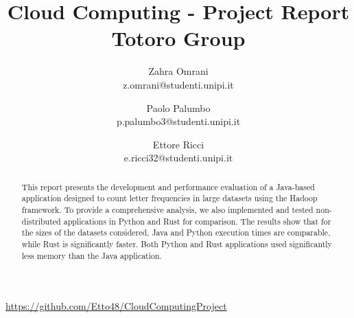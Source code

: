 \documentclass{article}
\title{Cloud Computing - Project Report \\ \small{Totoro Group}}
\author{
    Zahra Omrani \\ z.omrani@studenti.unipi.it \and 
    Paolo Palumbo \\ p.palumbo3@studenti.unipi.it \and
    Ettore Ricci \\ e.ricci32@studenti.unipi.it}
\begin{document}
\maketitle
\begin{center}
    \scriptsize
    \href{https://github.com/Etto48/CloudComputingProject}{https://github.com/Etto48/CloudComputingProject}
\end{center}

\begin{abstract}
    This report presents the development and performance evaluation of a Java-based application 
    designed to count letter frequencies in large datasets using the Hadoop framework. 
    To provide a comprehensive analysis, we also implemented and tested non-distributed 
    applications in Python and Rust for comparison.
    The results show that for the sizes of the datasets considered, Java and Python execution 
    times are comparable, while Rust is significantly faster. 
    Both Python and Rust applications used significantly less memory than the Java application.
\end{abstract}
\end{document}
